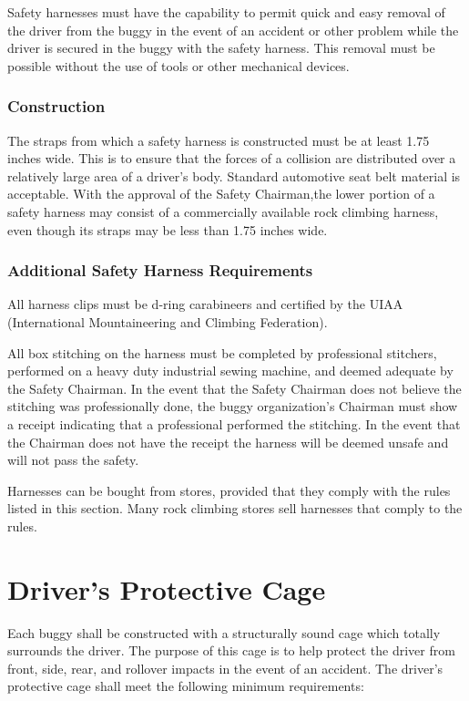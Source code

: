 \documentclass[openany]{book}
\begin{document}
Safety harnesses must have the capability to permit quick and easy removal of the driver from the buggy in the event of an accident or other problem while the driver is secured in the buggy with the safety harness. This removal must be possible without the use of tools or other mechanical devices.

\subsubsection{Construction}

The straps from which a safety harness is constructed must be at least 1.75 inches wide. This is to ensure that the forces of a collision are distributed over a relatively large area of a driver's body. Standard automotive seat belt material is acceptable. With the approval of the Safety Chairman,the lower portion of a safety harness may consist of a commercially available rock climbing harness, even though its straps may be less than 1.75 inches wide.

\subsubsection{Additional Safety Harness Requirements}
All harness clips must be d-ring carabineers and certified by the UIAA (International Mountaineering and Climbing Federation).

All box stitching on the harness must be completed by professional stitchers, performed on a heavy duty industrial sewing machine, and deemed adequate by the Safety Chairman. In the event that the Safety Chairman does not believe the stitching was professionally done, the buggy organization’s Chairman must show a receipt indicating that a professional performed the stitching. In the event that the Chairman does not have the receipt the harness will be deemed unsafe and will not pass the safety.

Harnesses can be bought from stores, provided that they comply with the rules listed in this section. Many rock climbing stores sell harnesses that comply to the rules.

\section{Driver's Protective Cage}

Each buggy shall be constructed with a structurally sound cage which totally surrounds the driver. The purpose of this cage is to help protect the driver from front, side, rear, and rollover impacts in the event of an accident. The driver's protective cage shall meet the following minimum requirements:
\end{document}
